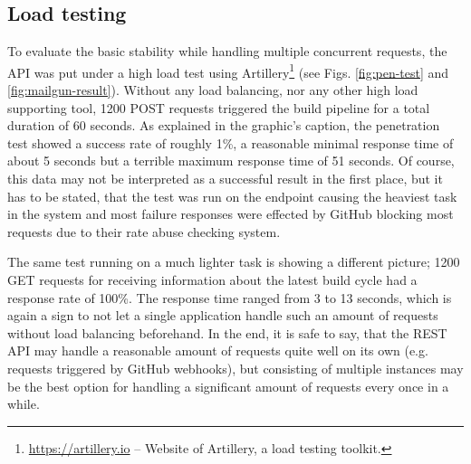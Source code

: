 \subsection{Load testing}
To evaluate the basic stability while handling multiple concurrent requests, the API was put under a high load test using Artillery\footnote{\url{https://artillery.io} -- Website of Artillery, a load testing toolkit.} (see Figs. \ref{fig:pen-test} and \ref{fig:mailgun-result}). Without any load balancing, nor any other high load supporting tool, 1200 POST requests triggered the build pipeline for a total duration of 60 seconds. As explained in the graphic's caption, the penetration test showed a success rate of roughly 1\%, a reasonable minimal response time of about 5 seconds but a terrible maximum response time of 51 seconds. Of course, this data may not be interpreted as a successful result in the first place, but it has to be stated, that the test was run on the endpoint causing the heaviest task in the system and most failure responses were effected by GitHub blocking most requests due to their rate abuse checking system.

The same test running on a much lighter task is showing a different picture; 1200 GET requests for receiving information about the latest build cycle had a response rate of 100\%. The response time ranged from 3 to 13 seconds, which is again a sign to not let a single application handle such an amount of requests without load balancing beforehand. In the end, it is safe to say, that the REST API may handle a reasonable amount of requests quite well on its own (e.g. requests triggered by GitHub webhooks), but consisting of multiple instances may be the best option for handling a significant amount of requests every once in a while.
